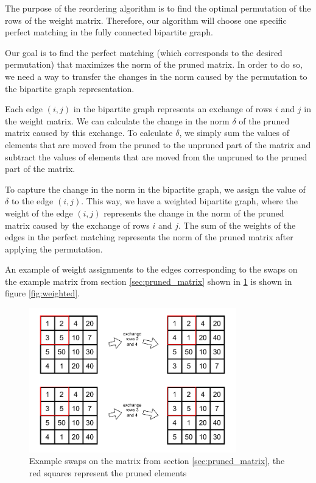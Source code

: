 The purpose of the reordering algorithm is to find the optimal permutation of the rows of the weight matrix. Therefore, our algorithm will choose one specific perfect matching in the fully connected bipartite graph.

Our goal is to find the perfect matching (which corresponds to the desired permutation) that maximizes the norm of the pruned matrix. In order to do so, we need a way to transfer the changes in the norm caused by the permutation to the bipartite graph representation.

Each edge $(i, j)$ in the bipartite graph represents an exchange of rows $i$ and $j$ in the weight matrix. We can calculate the change in the norm $\delta$ of the pruned matrix caused by this exchange. To calculate $\delta$, we simply sum the values of elements that are moved from the pruned to the unpruned part of the matrix and subtract the values of elements that are moved from the unpruned to the pruned part of the matrix.

To capture the change in the norm in the bipartite graph, we assign the value of $\delta$ to the edge $(i, j)$. This way, we have a weighted bipartite graph, where the weight of the edge $(i, j)$ represents the change in the norm of the pruned matrix caused by the exchange of rows $i$ and $j$. The sum of the weights of the edges in the perfect matching represents the norm of the pruned matrix after applying the permutation.

An example of weight assignments to the edges corresponding to the swaps on the example matrix from section \ref{sec:pruned_matrix} shown in \ref{fig:norm-change} is shown in figure \ref{fig:weighted}.

\begin{figure}[h]
    \centerline{\includegraphics[width=0.8\textwidth]{images/norm-change}}
    \caption[Swaps on the matrix]{Example swaps on the matrix from section \ref{sec:pruned_matrix}, the red squares represent the pruned elements}
    \label{fig:norm-change}
\end{figure}

